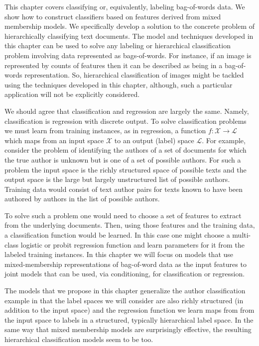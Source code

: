 This chapter covers classifying or, equivalently, labeling bag-of-words data.  We show how to construct classifiers based on features derived from mixed membership models.  We specifically develop a solution to the concrete problem of hierarchically classifying text documents.  The model and techniques developed in this chapter can be used to solve any labeling or hierarchical classification problem involving data represented as bags-of-words.  For instance,  if an image is represented by counts of features then it can be described as being in a bag-of-words representation.   So, hierarchical classification of images might be tackled using the techniques developed in this chapter, although, such a particular application will not be explicitly considered.

We should agree that classification and regression are largely the same.  Namely, classification is regression with discrete output.  To solve classification problems we must learn from training instances, as in regression, a function $f : \mathcal{X} \rightarrow \mathcal{L}$ which maps from an input space $\mathcal{X}$ to an output (label) space $\mathcal{L}$.   For example, consider the problem of identifying the authors of a set of documents for which the true author is unknown but is one of a set of possible authors.   For such a problem the input space is the richly structured space of possible texts and the output space is the large but largely unstructured list of possible authors.  Training data would consist of text author pairs for texts known to have been authored by authors in the list of possible authors.

To solve such a problem one would need to choose a set of features to extract from the underlying documents. Then, using those features and the training data, a classification function would be learned.  In this case one might choose a multi-class logistic or probit regression function and learn parameters for it from the labeled training instances.   In this chapter we will focus on models that use mixed-membership representations of bag-of-word data as the input features to joint models that can be used, via conditioning, for classification or regression.

The models that we propose in this chapter generalize the author classification example in that the label spaces we will consider are also richly structured (in addition to the input space) and the regression function we learn maps from from the input space to labels in a structured, typically hierarchical label space.  In the same way that mixed membership models are surprisingly effective, the resulting hierarchical classification models seem to be too.

